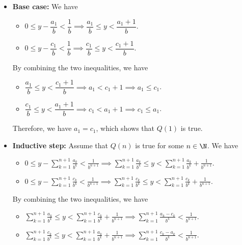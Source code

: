     \begin{itemize}
        \item \textbf{Base case:} We have
        \begin{itemize}
            \item $0 \leq y - \dfrac{a_{1}}{b} < \dfrac{1}{b} \implies \dfrac{a_{1}}{b} \leq y < \dfrac{a_{1} + 1}{b}$.
            \item $0 \leq y - \dfrac{c_{1}}{b} < \dfrac{1}{b} \implies \dfrac{c_{1}}{b} \leq y < \dfrac{c_{1} + 1}{b}$. 
        \end{itemize}
        By combining the two inequalities, we have
        \begin{itemize}
            \item $\dfrac{a_{1}}{b} \leq y < \dfrac{c_{1} + 1}{b} \implies a_{1} < c_{1} + 1 \implies a_{1} \leq c_{1}$.
            \item $\dfrac{c_{1}}{b} \leq y < \dfrac{a_{1} + 1}{b} \implies c_{1} < a_{1} + 1 \implies c_{1} \leq a_{1}$.
        \end{itemize}
        Therefore, we have $a_{1} = c_{1}$, which shows that $Q(1)$ is true.
        \item \textbf{Inductive step:} Assume that $Q(n)$ is true for some $n \in \N$. We have
        \begin{itemize}
            \item $\displaystyle 0 \leq y - \sum_{k = 1}^{n + 1} \frac{a_{k}}{b^{k}} < \frac{1}{b^{n + 1}} \implies
            \sum_{k = 1}^{n + 1} \frac{a_{k}}{b^{k}} \leq y < \sum_{k = 1}^{n + 1} \frac{a_{k}}{b^{k}} + \frac{1}{b^{n + 1}}$.
            \item $\displaystyle 0 \leq y - \sum_{k = 1}^{n + 1} \frac{c_{k}}{b^{k}} < \frac{1}{b^{n + 1}} \implies
            \sum_{k = 1}^{n + 1} \frac{c_{k}}{b^{k}} \leq y < \sum_{k = 1}^{n + 1} \frac{c_{k}}{b^{k}} + \frac{1}{b^{n + 1}}$.
        \end{itemize}
        By combining the two inequalities, we have
        \begin{itemize}
            \item $\displaystyle \sum_{k = 1}^{n + 1} \frac{a_{k}}{b^{k}} \leq y < \sum_{k = 1}^{n + 1} \frac{c_{k}}{b^{k}}
            + \frac{1}{b^{n + 1}} \implies \sum_{k = 1}^{n + 1} \frac{a_{k} - c_{k}}{b^{k}} < \frac{1}{b^{n + 1}}$.
            \item $\displaystyle \sum_{k = 1}^{n + 1} \frac{c_{k}}{b^{k}} \leq y < \sum_{k = 1}^{n + 1} \frac{a_{k}}{b^{k}}
            + \frac{1}{b^{n + 1}} \implies \sum_{k = 1}^{n + 1} \frac{c_{k} - a_{k}}{b^{k}} < \frac{1}{b^{n + 1}}$.

\end{itemize}
\end{itemize}
